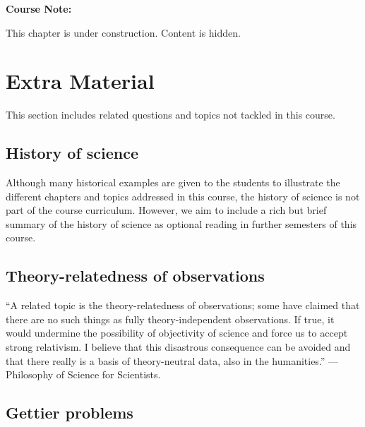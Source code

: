 \documentclass[
]{book}
\begin{document}
\begin{notebox}

\begin{center}
\textbf{Course Note:}

\end{center}

This chapter is under construction. Content is hidden.

\end{notebox}

\hypertarget{wont-fix}{%
\chapter{Extra Material}\label{wont-fix}}

This section includes related questions and topics not tackled in this course.

\hypertarget{history-of-science}{%
\section{History of science}\label{history-of-science}}

Although many historical examples are given to the students to illustrate the different chapters and topics addressed in this course, the history of science is not part of the course curriculum. However, we aim to include a rich but brief summary of the history of science as optional reading in further semesters of this course.

\hypertarget{theory-relatedness-of-observations}{%
\section{Theory-relatedness of observations}\label{theory-relatedness-of-observations}}

``A related topic is the theory-relatedness of observations; some have claimed that there are no such things as fully theory-independent observations. If true, it would undermine the possibility of objectivity of science and force us to accept strong relativism. I believe that this disastrous consequence can be avoided and that there really is a basis of theory-neutral data, also in the humanities.'' --- Philosophy of Science for Scientists.

\hypertarget{gettier-problems}{%
\section{Gettier problems}\label{gettier-problems}}
\end{document}
